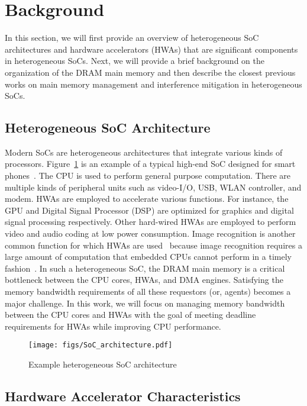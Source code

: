 \documentclass[10pt,letterpaper]{article}
\newcommand{\TMP}[1]{#1}
\begin{document}
 
\section{Background}

In this section, we will first provide an overview of
heterogeneous SoC architectures and hardware accelerators (HWAs)
that are significant components in heterogeneous SoCs. Next, we
will provide a brief background on the organization of the DRAM
main memory and then describe the closest previous works on
main memory management and interference mitigation in
heterogeneous SoCs.


\subsection{Heterogeneous SoC Architecture} Modern SoCs are heterogeneous
architectures that integrate various kinds of processors.
Figure~\ref{fig:hetero-SoC} is an example of a typical high-end SoC designed for
smart phones~\cite{snapdragon,exnos}. The CPU is used to perform general purpose
computation. 
\TMP{There are multiple kinds of peripheral units such as video-I/O,
USB, WLAN controller, and modem.}
HWAs are employed to accelerate various
functions. For instance, the GPU and Digital Signal Processor (DSP) are
optimized for graphics and digital signal processing respectively. Other
hard-wired HWAs are employed to perform video and audio coding at low power
consumption.
Image recognition is another common function for which HWAs are
used~\cite{visconti2,mobileeye} because image recognition requires a large
amount of computation that embedded CPUs cannot perform in a timely
fashion~\cite{visconti2}. In such a heterogeneous SoC, the DRAM main memory is a
critical bottleneck between the CPU cores, HWAs, and DMA engines. Satisfying the
memory bandwidth requirements of all these requestors (or, agents) becomes a
major challenge. In this work, we will focus on managing memory bandwidth
between the CPU cores and HWAs with the goal of meeting deadline requirements
for HWAs while improving CPU performance.

\begin{figure}
  \centering
  \texttt{[image: figs/SoC\_architecture.pdf]}
\caption{Example heterogeneous SoC architecture}
  \label{fig:hetero-SoC}
\end{figure}

\subsection{Hardware Accelerator Characteristics}
\label{sec:hwa_char}
\end{document}
